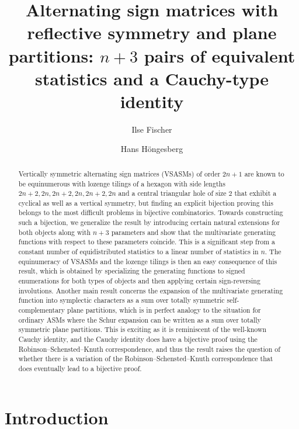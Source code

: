 \documentclass[12pt]{amsart}
\title[Vertically symmetric alternating sign matrices]{Alternating sign matrices with reflective symmetry and plane partitions: \boldmath $n+3$ pairs of equivalent statistics and a Cauchy-type identity}
\author{Ilse Fischer}
\author{Hans H\"ongesberg}
\theoremstyle{definition}
\numberwithin{equation}{section}
\begin{document}
\begin{abstract}
Vertically symmetric alternating sign matrices (VSASMs) of order $2n+1$ are known to be equinumerous with 
lozenge tilings of a hexagon with side lengths $2n+2,2n,2n+2,2n,2n+2,2n$ and a central triangular hole of size $2$ that exhibit a cyclical as well as a vertical symmetry, but finding an explicit bijection proving this belongs to the most difficult problems in bijective combinatorics. Towards constructing such a bijection, we generalize 
the result by introducing certain natural extensions for both objects along with $n+3$ parameters and show that the multivariate generating functions with respect to these parameters coincide. 
This is a significant step from a constant number of equidistributed statistics to a linear number of statistics in $n$.
The equinumeracy of VSASMs and the lozenge tilings is then an easy consequence of this result, which is obtained by specializing the generating functions to signed enumerations for both types of objects and then applying certain sign-reversing involutions.
Another main result concerns the expansion of the 
multivariate generating function into symplectic characters as a sum over totally symmetric self-complementary plane partitions, which is 
in perfect analogy to the situation for ordinary ASMs where the Schur expansion can be written as a sum over totally symmetric plane partitions.
This is exciting as it is reminiscent of the well-known Cauchy identity, and the Cauchy identity does have a bijective proof using the Robinson--Schensted--Knuth correspondence, and thus the result raises the question of whether there is a variation of the Robinson--Schensted--Knuth correspondence that does eventually lead to a bijective proof.
\end{abstract}

\maketitle

\section{Introduction}
\end{document}
